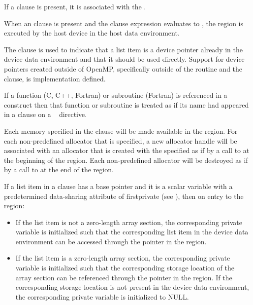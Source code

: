 If a  clause is present, it is associated with the .

When an  clause is present and the  clause expression evaluates to , the  region is executed by the host device in the host data environment.

The  clause is used to indicate that a list item is a device
pointer already in the device data environment and that it should be used
directly.  Support for device pointers created outside of OpenMP, specifically
outside of the  routine and the  clause,
is implementation defined.

If a function (C, C++, Fortran) or subroutine (Fortran) is referenced in a
 construct then that function or subroutine is treated as if its
name had appeared in a  clause on a ~
directive.

Each memory  specified in the  clause will be made available in the  region. For each non-predefined allocator that is specified, a new allocator handle will be associated with an allocator that is created with the specified  as if by a call to  at the beginning of the  region. Each non-predefined allocator will be destroyed as if by a call to  at the end of the  region.

\begin{ccppspecific}

If a list item in a  clause has a base pointer and it is a
scalar variable with a predetermined data-sharing attribute of firstprivate
(see ), then on entry to the  region:

\begin{itemize}
\item If the list item is not a zero-length array section, the corresponding
private variable is initialized such that the corresponding list item in the
device data environment can be accessed through the pointer in the
 region.

\item If the list item is a zero-length array section, the corresponding
private variable is initialized such that the corresponding storage location
of the array section can be referenced through the pointer in the 
region. If the corresponding storage location is not present in the device
data environment, the corresponding private variable is initialized to NULL.
\end{itemize}

\end{ccppspecific}

